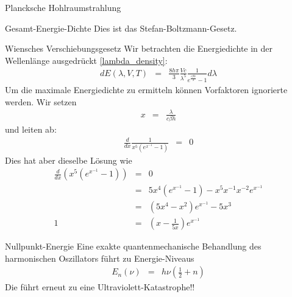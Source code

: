 \begin{chapter}{\titlestr}
\begin{section}{Plancksche Hohlraumstrahlung}
\begin{subsection}{Gesamt-Energie-Dichte}
Dies ist das Stefan-Boltzmann-Gesetz.
\end{subsection}

\begin{subsection}{Wiensches Verschiebungsgesetz}
Wir betrachten die Energiedichte in der Wellenlänge ausgedrückt \ref{lambda_density}:
\begin{eqnarray*}
d E(\lambda,V,T) &=&\frac{8h\pi}{3}\frac{Vc}{\lambda^5} \frac{1}{e^{\frac{c\beta h}{\lambda}}-1}d\lambda
\end{eqnarray*}
Um die maximale Energiedichte zu ermitteln können Vorfaktoren ignorierte werden. Wir setzen
\begin{eqnarray*}
 x &=& \frac{\lambda}{c\beta h}
\end{eqnarray*}
und leiten ab:
\begin{eqnarray*}
\frac{d}{dx}\frac{1}{x^5\left(e^{x^{-1}}-1\right)}&=&0
\end{eqnarray*}
Dies hat aber dieselbe Lösung wie
\begin{eqnarray*}
\frac{d}{dx}\left(x^5\left(e^{x^{-1}}-1\right)\right)&=&0\\
&=& 5x^4\left(e^{x^{-1}}-1\right)-x^5x^{-1}x^{-2}e^{x^{-1}}\\
&=&\left(5x^4-x^2\right)e^{x^{-1}}-5x^3\\
1&=&\left(x-\frac{1}{5x}\right)e^{x^{-1}}
\end{eqnarray*}
\end{subsection}

\begin{subsection}{Nullpunkt-Energie}
Eine exakte quantenmechanische Behandlung des harmonischen Oszillators führt zu Energie-Niveaus 
\begin{eqnarray*}
E_n(\nu) &=& h\nu \left(\frac{1}{2}+n\right)
\end{eqnarray*}
Die führt erneut zu eine Ultraviolett-Katastrophe!!
\end{subsection}
\end{section}


\end{chapter}
